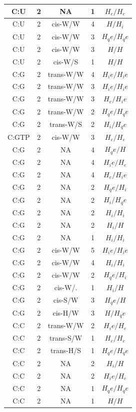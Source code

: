 \begin{center}
\begin{longtable}{c|c|c|c|c}
C:U & 2 & NA & 1 & $H_e/H_e$ \\  \hline
C:U & 2 & cis-W/W & 4 & $H/H_i$ \\  \hline
C:U & 2 & cis-W/W & 3 & $H_qe/H_qe$ \\  \hline
C:U & 2 & cis-W/W & 3 & $H/H$ \\  \hline
C:U & 2 & cis-W/S & 1 & $H/H$ \\  \hline
C:G & 2 & trans-W/W & 4 & $H_ie/H_ie$ \\  \hline
C:G & 2 & trans-W/W & 3 & $H_ie/H_ie$ \\  \hline
C:G & 2 & trans-W/W & 3 & $H_e/H_ie$ \\  \hline
C:G & 2 & trans-W/W & 2 & $H_qe/H_qe$ \\  \hline
C:G & 2 & trans-W/S & 2 & $H_i/H_qe$ \\  \hline
C:GTP & 2 & cis-W/W & 3 & $H_e/H_e$ \\  \hline
C:G & 2 & NA & 4 & $H_qe/H$ \\  \hline
C:G & 2 & NA & 4 & $H_ie/H_e$ \\  \hline
C:G & 2 & NA & 4 & $H_e/H_ie$ \\  \hline
C:G & 2 & NA & 2 & $H_qe/H_i$ \\  \hline
C:G & 2 & NA & 2 & $H_i/H_qe$ \\  \hline
C:G & 2 & NA & 2 & $H_i/H_i$ \\  \hline
C:G & 2 & NA & 2 & $H_i/H$ \\  \hline
C:G & 2 & NA & 1 & $H_i/H_i$ \\  \hline
C:G & 2 & cis-W/W & 5 & $H_ie/H_ie$ \\  \hline
C:G & 2 & cis-W/W & 4 & $H_i/H_i$ \\  \hline
C:G & 2 & cis-W/W & 2 & $H_qe/H_i$ \\  \hline
C:G & 2 & cis-W/. & 1 & $H_i/H$ \\  \hline
C:G & 2 & cis-S/W & 3 & $H_qe/H$ \\  \hline
C:G & 2 & cis-H/W & 3 & $H/H_qe$ \\  \hline
C:C & 2 & trans-W/W & 2 & $H_ie/H_e$ \\  \hline
C:C & 2 & trans-S/W & 1 & $H_e/H_e$ \\  \hline
C:C & 2 & trans-H/S & 1 & $H_qe/H_qe$ \\  \hline
C:C & 2 & NA & 2 & $H_i/H$ \\  \hline
C:C & 2 & NA & 2 & $H_ie/H_e$ \\  \hline
C:C & 2 & NA & 1 & $H_qe/H_qe$ \\  \hline
C:C & 2 & NA & 1 & $H/H$ \\  \hline

\end{longtable}
\end{center}
